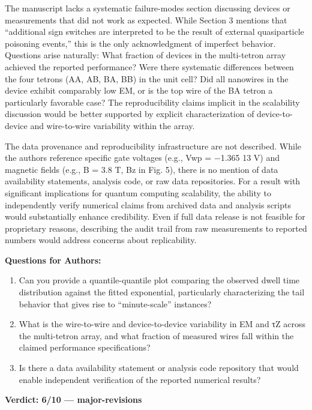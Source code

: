 \documentclass[10pt,letterpaper]{article}
\begin{document}
The manuscript lacks a systematic failure-modes section discussing devices or measurements that did not work as expected. While Section 3 mentions that ``additional sign switches are interpreted to be the result of external quasiparticle poisoning events,'' this is the only acknowledgment of imperfect behavior. Questions arise naturally: What fraction of devices in the multi-tetron array achieved the reported performance? Were there systematic differences between the four tetrons (AA, AB, BA, BB) in the unit cell? Did all nanowires in the device exhibit comparably low EM, or is the top wire of the BA tetron a particularly favorable case? The reproducibility claims implicit in the scalability discussion would be better supported by explicit characterization of device-to-device and wire-to-wire variability within the array.

The data provenance and reproducibility infrastructure are not described. While the authors reference specific gate voltages (e.g., Vwp = −1.365 13 V) and magnetic fields (e.g., B = 3.8 T, Bz in Fig. 5), there is no mention of data availability statements, analysis code, or raw data repositories. For a result with significant implications for quantum computing scalability, the ability to independently verify numerical claims from archived data and analysis scripts would substantially enhance credibility. Even if full data release is not feasible for proprietary reasons, describing the audit trail from raw measurements to reported numbers would address concerns about replicability.

\textbf{Questions for Authors:}

\begin{enumerate}
\def\labelenumi{\arabic{enumi}.}
\item
  Can you provide a quantile-quantile plot comparing the observed dwell time distribution against the fitted exponential, particularly characterizing the tail behavior that gives rise to ``minute-scale'' instances?
\item
  What is the wire-to-wire and device-to-device variability in EM and τZ across the multi-tetron array, and what fraction of measured wires fall within the claimed performance specifications?
\item
  Is there a data availability statement or analysis code repository that would enable independent verification of the reported numerical results?
\end{enumerate}

\textbf{Verdict: 6/10 --- major-revisions}
\end{document}
